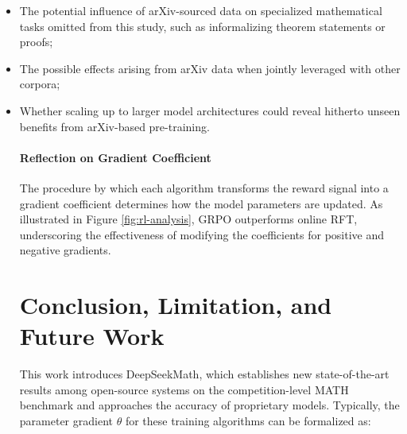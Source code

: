 \begin{itemize}[topsep=0pt]
    \item The potential influence of arXiv-sourced data on specialized mathematical tasks omitted from this study, such as informalizing theorem statements or proofs;
    \item The possible effects arising from arXiv data when jointly leveraged with other corpora;
    \item Whether scaling up to larger model architectures could reveal hitherto unseen benefits from arXiv-based pre-training. \paragraph{Reflection on Gradient Coefficient} The procedure by which each algorithm transforms the reward signal into a gradient coefficient determines how the model parameters are updated. As illustrated in Figure \ref{fig:rl-analysis}, GRPO outperforms online RFT, underscoring the effectiveness of modifying the coefficients for positive and negative gradients. \section{Conclusion, Limitation, and Future Work} 

This work introduces DeepSeekMath, which establishes new state-of-the-art results among open-source systems on the competition-level MATH benchmark and approaches the accuracy of proprietary models. Typically, the parameter gradient $\theta$ for these training algorithms can be formalized as:


\end{itemize}
